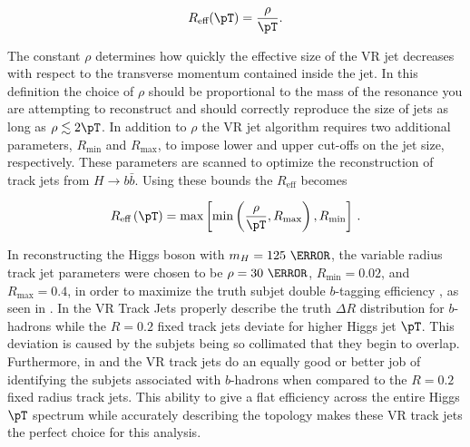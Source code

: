 \[ R_{\text{eff}}(\pT) = \frac{\rho}{\pT}. \]

The constant $\rho$ determines how quickly the effective size of the VR jet
decreases with respect to the transverse momentum contained inside the jet.  In
this definition the choice of $\rho$ should be proportional to the mass of the
resonance you are attempting to reconstruct and should correctly reproduce the
size of jets as long as $\rho \lesssim 2\pT$. In addition to $\rho$ the VR jet
algorithm requires two additional parameters, $R_{\text{min}}$ and
$R_{\text{max}}$, to impose lower and upper cut-offs on the jet size,
respectively.  These parameters are scanned to optimize the reconstruction of
track jets from $H \rightarrow b\bar{b}$. Using these bounds the
$R_{\text{eff}}$ becomes 

\[
 R_{\text{eff}} \left(\pT\right)= \text{max}\left[\text{min}\left(\frac{\rho}{\pT},R_{\text{max}}\right),R_{\text{min}}\right]\,.
\]

In reconstructing the Higgs boson with $m_{H} = 125~\GeV$, the variable radius
track jet parameters were chosen to be $\rho = 30~\GeV$, $R_{\text{min}}=0.02$,
and $R_{\text{max}}=0.4$, in order to maximize the truth subjet double
$b$-tagging efficiency \cite{ATL-PHYS-PUB-2017-010}, as seen in
.  In  the VR Track Jets
properly describe the truth $\Delta R$ distribution for $b$-hadrons while the
$R=0.2$ fixed track jets deviate for higher Higgs jet $\pT$. This deviation is
caused by the subjets being so collimated that they begin to overlap.
Furthermore, in  and
 the VR track jets do an equally good or better
job of identifying the subjets associated with $b$-hadrons when compared to the
$R=0.2$ fixed radius track jets.  This ability to give a flat efficiency across
the entire Higgs $\pT$ spectrum while accurately describing the topology makes
these VR track jets the perfect choice for this analysis.

